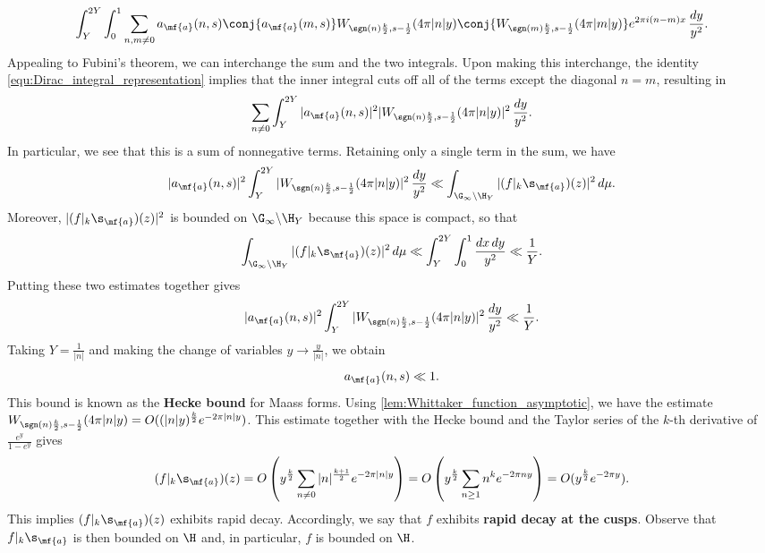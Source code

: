     \[
      \int_{Y}^{2Y}\int_{0}^{1}\sum_{n,m \neq 0}a_{\mf{a}}(n,s)\conj{a_{\mf{a}}(m,s)}W_{\sgn(n)\frac{k}{2},s-\frac{1}{2}}(4\pi|n|y)\conj{W_{\sgn(m)\frac{k}{2},s-\frac{1}{2}}(4\pi|m|y)}e^{2\pi i(n-m)x}\,\frac{dy}{y^{2}}.
    \]
    Appealing to Fubini's theorem, we can interchange the sum and the two integrals. Upon making this interchange, the identity \cref{equ:Dirac_integral_representation} implies that the inner integral cuts off all of the terms except the diagonal $n = m$, resulting in
    \[
      \sum_{n \neq 0}\int_{Y}^{2Y}|a_{\mf{a}}(n,s)|^{2}|W_{\sgn(n)\frac{k}{2},s-\frac{1}{2}}(4\pi|n|y)|^{2}\,\frac{dy}{y^{2}}.
    \]
    In particular, we see that this is a sum of nonnegative terms. Retaining only a single term in the sum, we have
    \[
      |a_{\mf{a}}(n,s)|^{2}\int_{Y}^{2Y}|W_{\sgn(n)\frac{k}{2},s-\frac{1}{2}}(4\pi|n|y)|^{2}\,\frac{dy}{y^{2}} \ll \int_{\G_{\infty}\backslash\H_{Y}}|(f|_{k}\s_{\mf{a}})(z)|^{2}\,d\mu.
    \]
    Moreover, $|(f|_{k}\s_{\mf{a}})(z)|^{2}$ is bounded on $\G_{\infty}\backslash\H_{Y}$ because this space is compact, so that
    \[
      \int_{\G_{\infty}\backslash\H_{Y}}|(f|_{k}\s_{\mf{a}})(z)|^{2}\,d\mu \ll \int_{Y}^{2Y}\int_{0}^{1}\frac{dx\,dy}{y^{2}} \ll \frac{1}{Y}.
    \]
    Putting these two estimates together gives
    \[
      |a_{\mf{a}}(n,s)|^{2}\int_{Y}^{2Y}|W_{\sgn(n)\frac{k}{2},s-\frac{1}{2}}(4\pi|n|y)|^{2}\,\frac{dy}{y^{2}} \ll \frac{1}{Y}.
    \]
    Taking $Y = \frac{1}{|n|}$ and making the change of variables $y \to \frac{y}{|n|}$, we obtain
    \[
      a_{\mf{a}}(n,s) \ll 1.
    \]
    This bound is known as the \textbf{Hecke bound} for Maass forms. Using \cref{lem:Whittaker_function_asymptotic}, we have the estimate $W_{\sgn(n)\frac{k}{2},s-\frac{1}{2}}(4\pi|n|y) = O((|n|y)^{\frac{k}{2}}e^{-2\pi|n|y})$. This estimate together with the Hecke bound and the Taylor series of the $k$-th derivative of $\frac{e^{y}}{1-e^{y}}$ gives
    \[
      (f|_{k}\s_{\mf{a}})(z) = O\left(y^{\frac{k}{2}}\sum_{n \neq 0}|n|^{\frac{k+1}{2}}e^{-2\pi|n|y}\right) = O\left(y^{\frac{k}{2}}\sum_{n \ge 1}n^{k}e^{-2\pi ny}\right) = O(y^{\frac{k}{2}}e^{-2\pi y}).
    \]
    This implies $(f|_{k}\s_{\mf{a}})(z)$ exhibits rapid decay. Accordingly, we say that $f$ exhibits \textbf{rapid decay at the cusps}. Observe that $f|_{k}\s_{\mf{a}}$ is then bounded on $\H$ and, in particular, $f$ is bounded on $\H$.
